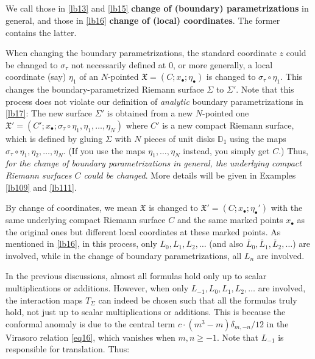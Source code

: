 \documentclass[12pt,a4paper,notitlepage]{article}
\theoremstyle{definition}
\theoremstyle{plain}
\newcommand{\fk}{\mathfrak}
\newcommand{\ovl}{\overline}
\newcommand{\blt}{\bullet}
\newcommand{\Dbb}{\mathbb D}
\numberwithin{equation}{section}
\begin{document}
\subsection{}


We call those in \ref{lb13} and \ref{lb15} \textbf{change of (boundary) parametrizations} in general, and those in \ref{lb16} \textbf{change of (local) coordinates}. The former contains the latter. 

When changing the boundary parametrizations, the standard coordinate $z$ could be changed to $\sigma_\tau$ not necessarily  defined at $0$, or more generally, a local coordinate (say) $\eta_1$ of an $N$-pointed $\fk X=(C;x_\blt;\eta_\blt)$ is changed to $\sigma_\tau\circ\eta_1$. This changes the boundary-parametrized Riemann surface $\Sigma$ to $\Sigma'$. Note that this process does not violate our definition of \emph{analytic} boundary parametrizations in \ref{lb17}: The new surface $\Sigma'$ is obtained from a new $N$-pointed one $\fk X'=(C';x_\blt;\sigma_\tau\circ\eta_1,\eta_1,\dots,\eta_N)$ where $C'$ is a new compact Riemann surface, which is defined by gluing $\Sigma$ with $N$ pieces of unit  disks $\Dbb_1$ using the maps $\sigma_\tau\circ\eta_1,\eta_2,\dots,\eta_N$. (If you use the maps $\eta_1,\dots,\eta_N$ instead, you simply get $C$.) Thus, \emph{for the change of boundary parametrizations in general, the underlying compact Riemann surfaces $C$ could be changed}. More details will be given in Examples \ref{lb109} and \ref{lb111}.

By change of coordinates, we mean $\fk X$ is changed to $\fk X'=(C;x_\blt;\eta_\blt')$ with the same underlying compact Riemann surface $C$ and the same marked points $x_\blt$ as the original ones but different local coordiates at these marked points. As mentioned in \ref{lb16}, in this process, only $L_0,L_1,L_2,\dots$ (and also $\ovl L_0,\ovl L_1,\ovl L_2,\dots$) are involved, while in the change of boundary parametrizations, all $L_n$ are involved. 



In the previous discussions, almost all formulas hold only up to scalar multiplications or additions. However, when only $L_{-1}, L_0, L_1, L_2,\dots$ are involved, the interaction maps $T_\Sigma$ can indeed be chosen such that all the formulas truly hold, not just up to scalar multiplications or additions. This is because the conformal anomaly is due to the central term $c\cdot (m^3-m)\delta_{m,-n}/12$ in the Virasoro relation \eqref{eq16}, which vanishes when $m,n\geq -1$. Note that $L_{-1}$ is responsible for translation. Thus:
\end{document}
